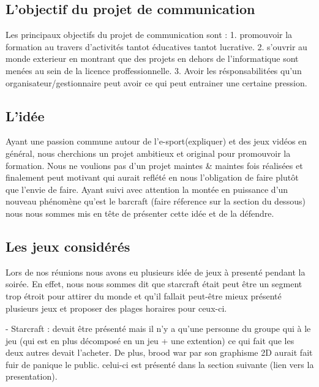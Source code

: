 \subsection{L'objectif du projet de communication}%
\label{sub:l_objectif_du_projet_de_communication}

Les principaux objectifs du projet de communication sont :
  1. promouvoir la formation au travers d'activités tantot éducatives
  tantot lucrative.
  2. s'ouvrir au monde exterieur en montrant que des projets en dehors
  de l'informatique sont menées au sein de la licence
  proffessionnelle.
  3. Avoir les résponsabilitées qu'un organisateur/gestionnaire peut
  avoir ce qui peut entrainer une certaine pression.

\subsection{L'idée}%
\label{sub:l_idee}

Ayant une passion commune autour de l'e-sport(expliquer) et des jeux
vidéos en général, nous cherchions un projet ambitieux et original
pour promouvoir la formation. Nous ne voulions pas d'un projet maintes
& maintes fois réalisées et finalement peut motivant qui aurait
reflété en nous l'obligation de faire plutôt que l'envie de faire.
Ayant suivi avec attention la montée en puissance d'un nouveau
phénomène qu'est le barcraft (faire réference sur la section du
dessous) nous nous sommes mis en tête de présenter cette idée et de la
défendre.

\subsection{Les jeux considérés}%
\label{sub:les_jeux_consideres}

Lors de nos réunions nous avons eu plusieurs idée de jeux à presenté
pendant la soirée. En effet, nous nous sommes dit que starcraft
était peut être un segment trop étroit pour attirer du monde et
qu'il fallait peut-être mieux présenté plusieurs jeux et proposer
des plages horaires pour ceux-ci.

- Starcraft : devait être présenté mais il n'y a qu'une personne du
groupe qui à le jeu (qui est en plus décomposé en un jeu + une
extention) ce qui fait que les deux autres devait l'acheter. De
plus, brood war par son graphisme 2D aurait fait fuir de panique le
public. celui-ci est présenté dans la section suivante (lien vers la
presentation).


